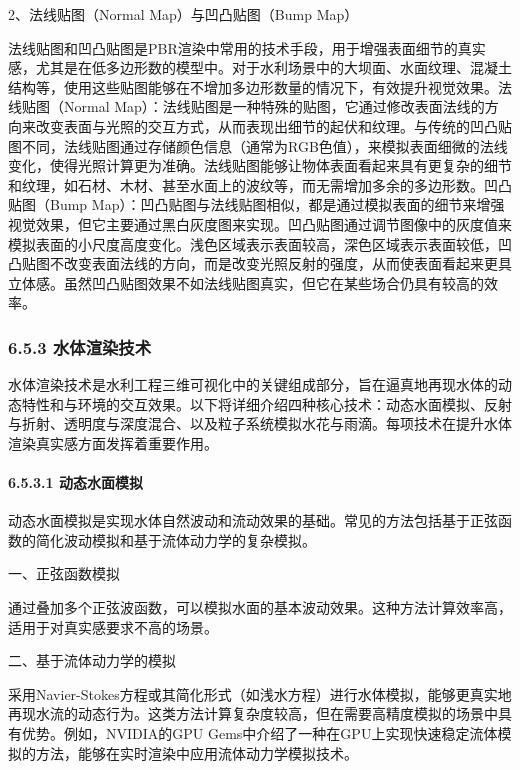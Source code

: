 2、法线贴图（Normal Map）与凹凸贴图（Bump Map）

法线贴图和凹凸贴图是PBR渲染中常用的技术手段，用于增强表面细节的真实感，尤其是在低多边形数的模型中。对于水利场景中的大坝面、水面纹理、混凝土结构等，使用这些贴图能够在不增加多边形数量的情况下，有效提升视觉效果。法线贴图（Normal Map）：法线贴图是一种特殊的贴图，它通过修改表面法线的方向来改变表面与光照的交互方式，从而表现出细节的起伏和纹理。与传统的凹凸贴图不同，法线贴图通过存储颜色信息（通常为RGB色值），来模拟表面细微的法线变化，使得光照计算更为准确。法线贴图能够让物体表面看起来具有更复杂的细节和纹理，如石材、木材、甚至水面上的波纹等，而无需增加多余的多边形数。凹凸贴图（Bump Map）：凹凸贴图与法线贴图相似，都是通过模拟表面的细节来增强视觉效果，但它主要通过黑白灰度图来实现。凹凸贴图通过调节图像中的灰度值来模拟表面的小尺度高度变化。浅色区域表示表面较高，深色区域表示表面较低，凹凸贴图不改变表面法线的方向，而是改变光照反射的强度，从而使表面看起来更具立体感。虽然凹凸贴图效果不如法线贴图真实，但它在某些场合仍具有较高的效率。

\subsubsection{6.5.3 水体渲染技术}\label{ux6c34ux4f53ux6e32ux67d3ux6280ux672f}

水体渲染技术是水利工程三维可视化中的关键组成部分，旨在逼真地再现水体的动态特性和与环境的交互效果。以下将详细介绍四种核心技术：动态水面模拟、反射与折射、透明度与深度混合、以及粒子系统模拟水花与雨滴。每项技术在提升水体渲染真实感方面发挥着重要作用。

\paragraph{6.5.3.1 动态水面模拟}\label{ux52a8ux6001ux6c34ux9762ux6a21ux62df}

动态水面模拟是实现水体自然波动和流动效果的基础。常见的方法包括基于正弦函数的简化波动模拟和基于流体动力学的复杂模拟。

一、正弦函数模拟

通过叠加多个正弦波函数，可以模拟水面的基本波动效果。这种方法计算效率高，适用于对真实感要求不高的场景。

二、基于流体动力学的模拟

采用Navier-Stokes方程或其简化形式（如浅水方程）进行水体模拟，能够更真实地再现水流的动态行为。这类方法计算复杂度较高，但在需要高精度模拟的场景中具有优势。例如，NVIDIA的GPU Gems中介绍了一种在GPU上实现快速稳定流体模拟的方法，能够在实时渲染中应用流体动力学模拟技术。

